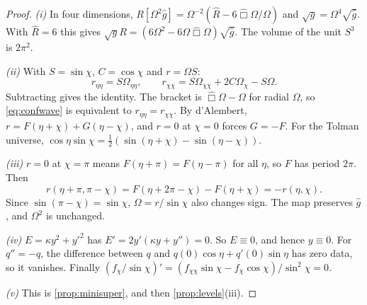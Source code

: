 \begin{proof}
\emph{(i)} In four dimensions, $R[\Omega^2\hat g]=\Omega^{-2}(\hat R-6\hat\Box\Omega/\Omega)$ and $\sqrt g=\Omega^4\sqrt{\hat g}$. With $\hat R=6$ this gives $\sqrt gR=(6\Omega^2-6\Omega\hat\Box\Omega)\sqrt{\hat g}$. The volume of the unit $S^3$ is $2\pi^2$.

\emph{(ii)} With $S=\sin\chi$, $C=\cos\chi$ and $r=\Omega S$:
\[
r_{\eta\eta}=S\Omega_{\eta\eta},\qquad r_{\chi\chi}=S\Omega_{\chi\chi}+2C\Omega_\chi-S\Omega .
\]
Subtracting gives the identity. The bracket is $\hat\Box\Omega-\Omega$ for radial $\Omega$, so \eqref{eq:confwave} is equivalent to $r_{\eta\eta}=r_{\chi\chi}$. By d'Alembert, $r=F(\eta+\chi)+G(\eta-\chi)$, and $r=0$ at $\chi=0$ forces $G=-F$. For the Tolman universe, $\cos\eta\sin\chi=\frac12(\sin(\eta+\chi)-\sin(\eta-\chi))$.

\emph{(iii)} $r=0$ at $\chi=\pi$ means $F(\eta+\pi)=F(\eta-\pi)$ for all $\eta$, so $F$ has period $2\pi$. Then
\[
r(\eta+\pi,\pi-\chi)=F(\eta+2\pi-\chi)-F(\eta+\chi)=-r(\eta,\chi).
\]
Since $\sin(\pi-\chi)=\sin\chi$, $\Omega=r/\sin\chi$ also changes sign. The map preserves $\hat g$, and $\Omega^2$ is unchanged.

\emph{(iv)} $E=\kappa y^2+y'^2$ has $E'=2y'(\kappa y+y'')=0$. So $E\equiv0$, and hence $y\equiv0$. For $q''=-q$, the difference between $q$ and $q(0)\cos\eta+q'(0)\sin\eta$ has zero data, so it vanishes. Finally $(f_\chi/\sin\chi)'=(f_{\chi\chi}\sin\chi-f_\chi\cos\chi)/\sin^2\chi=0$.

\emph{(v)} This is \cref{prop:minisuper}, and then \cref{prop:levels}(iii).
\end{proof}


